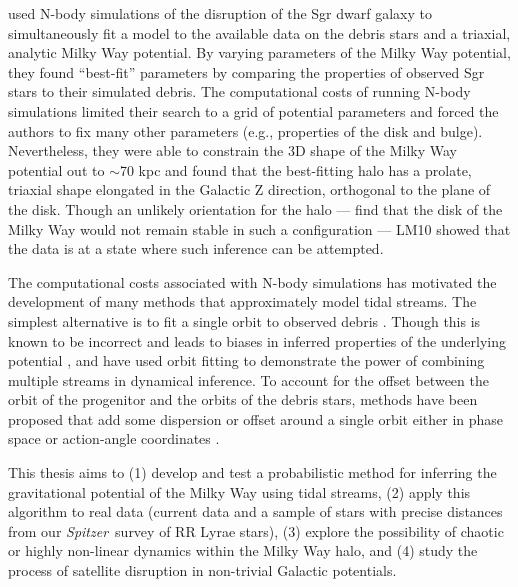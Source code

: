 \documentclass[letterpaper,12pt,preprint]{aastex}
\newcommand{\project}[1]{\textsl{#1}}
\newcommand{\spitzer}{\project{Spitzer}}
\begin{document}
\citet[][LM10]{law10} used N-body simulations of the disruption of the Sgr dwarf galaxy to simultaneously fit a model to the available data on the debris stars and a triaxial, analytic Milky Way potential. By varying parameters of the Milky Way potential, they found ``best-fit'' parameters by comparing the properties of observed Sgr stars to their simulated debris. The computational costs of running N-body simulations limited their search to a grid of potential parameters and forced the authors to fix many other parameters (e.g., properties of the disk and bulge). Nevertheless, they were able to constrain the 3D shape of the Milky Way potential out to $\sim$70 kpc and found that the best-fitting halo has a prolate, triaxial shape elongated in the Galactic Z direction, orthogonal to the plane of the disk. Though an unlikely orientation for the halo --- \cite{debattista13} find that the disk of the Milky Way would not remain stable in such a configuration --- LM10 showed that the data is at a state where such inference can be attempted. 

The computational costs associated with N-body simulations has motivated the development of many methods that approximately model tidal streams. The simplest alternative is to fit a single orbit to observed debris \citep[e.g.,][]{koposov10, deg13}. Though this is known to be incorrect and leads to biases in inferred properties of the underlying potential \citep[e.g.,][]{eyre11, lux13, sanders13a}, \cite{deg14} and \cite{lux13} have used orbit fitting to demonstrate the power of combining multiple streams in dynamical inference. To account for the offset between the orbit of the progenitor and the orbits of the debris stars, methods have been proposed that add some dispersion or offset around a single orbit either in phase space \citep[e.g.,][]{eyre09a, varghese11, kuepper12} or action-angle coordinates \citep{eyre11, sanders13b, bovy14, sanders14}. 

This thesis aims to (1) develop and test a probabilistic method for inferring the gravitational potential of the Milky Way using tidal streams, (2) apply this algorithm to real data (current data and a sample of stars with precise distances from our \spitzer\ survey of RR Lyrae stars), (3) explore the possibility of chaotic or highly non-linear dynamics within the Milky Way halo, and (4) study the process of satellite disruption in non-trivial Galactic potentials.
\end{document}
